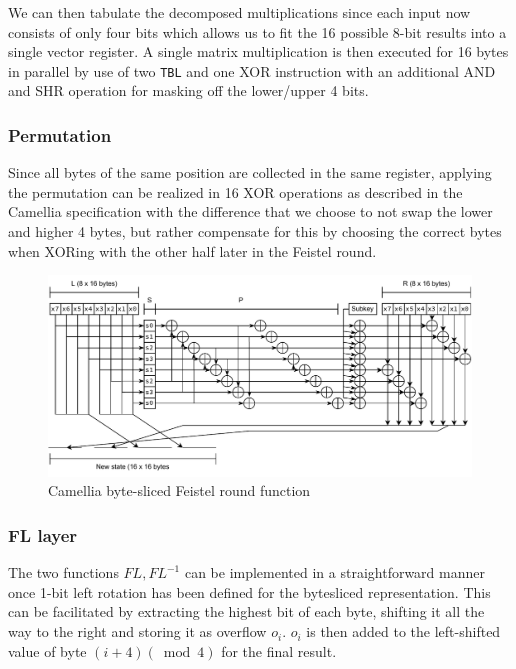 We can then tabulate the decomposed multiplications since each input now
consists of only four bits which allows us to fit the 16 possible 8-bit results
into a single vector register. A single matrix multiplication is then executed
for 16 bytes in parallel by use of two \texttt{TBL} and one XOR instruction with
an additional AND and SHR operation for masking off the lower/upper 4 bits.

\subsubsection{Permutation}

Since all bytes of the same position are collected in the same register,
applying the permutation can be realized in 16 XOR operations as described in
the Camellia specification with the difference that we choose to not swap the
lower and higher 4 bytes, but rather compensate for this by choosing the
correct bytes when XORing with the other half later in the Feistel round.


\begin{figure}[h!]
    \centering
    \includegraphics[width=\textwidth]{Figures/camelliaround.pdf}
    \caption{Camellia byte-sliced Feistel round function}
\end{figure}

\subsubsection{FL layer}

The two functions $FL,FL^{-1}$ can be implemented in a straightforward manner
once 1-bit left rotation has been defined for the bytesliced representation.
This can be facilitated by extracting the highest bit of each byte, shifting it
all the way to the right and storing it as overflow $o_i$. $o_i$ is then added
to the left-shifted value of byte $(i + 4) (\bmod 4)$ for the final result.

